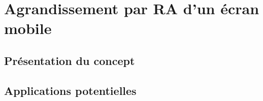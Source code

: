 \chapter{Agrandissement par RA d'un écran mobile}
\label{ch:concept}

\section{Présentation du concept}

\section{Applications potentielles}